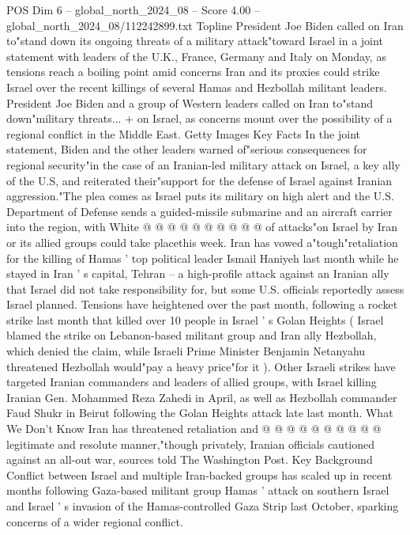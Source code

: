 \begin{textsample}{POS Dim 6 – global\_north\_2024\_08 – Score 4.00 – global\_north\_2024\_08/112242899.txt}  \label{ex:f6_pos_299}
Topline President Joe Biden called on Iran to"stand down its ongoing threats of a military attack"toward Israel in a joint statement with leaders of the U.K., France, Germany and Italy on Monday, as tensions reach a boiling point amid concerns Iran and its proxies could strike Israel over the recent killings of several Hamas and Hezbollah militant leaders.
President Joe Biden and a group of Western leaders called on Iran to"stand down"military threats... + on Israel, as concerns mount over the possibility of a regional conflict in the Middle East.
Getty Images Key Facts In the joint statement, Biden and the other leaders warned of"serious consequences for regional security"in the case of an Iranian-led military attack on Israel, a key ally of the U.S, and reiterated their"support for the defense of Israel against Iranian aggression."The plea comes as Israel puts its military on high alert and the U.S.
Department of Defense sends a guided-missile submarine and an aircraft carrier into the region, with White @ @ @ @ @ @ @ @ @ @ of attacks"on Israel by Iran or its allied groups could take placethis week.
Iran has vowed a"tough"retaliation for the killing of Hamas ' top political leader Ismail Haniyeh last month while he stayed in Iran ' s capital, Tehran -- a high-profile attack against an Iranian ally that Israel did not take responsibility for, but some U.S. officials reportedly assess Israel planned.
Tensions have heightened over the past month, following a rocket strike last month that killed over 10 people in Israel ' s Golan Heights ( Israel blamed the strike on Lebanon-based militant group and Iran ally Hezbollah, which denied the claim, while Israeli Prime Minister Benjamin Netanyahu threatened Hezbollah would"pay a heavy price"for it ).
Other Israeli strikes have targeted Iranian commanders and leaders of allied groups, with Israel killing Iranian Gen.
Mohammed Reza Zahedi in April, as well as Hezbollah commander Faud Shukr in Beirut following the Golan Heights attack late last month.
What We Don't Know Iran has threatened retaliation and @ @ @ @ @ @ @ @ @ @ legitimate and resolute manner,"though privately, Iranian officials cautioned against an all-out war, sources told The Washington Post.
Key Background Conflict between Israel and multiple Iran-backed groups has scaled up in recent months following Gaza-based militant group Hamas ' attack on southern Israel and Israel ' s invasion of the Hamas-controlled Gaza Strip last October, sparking concerns of a wider regional conflict.

\end{textsample}
